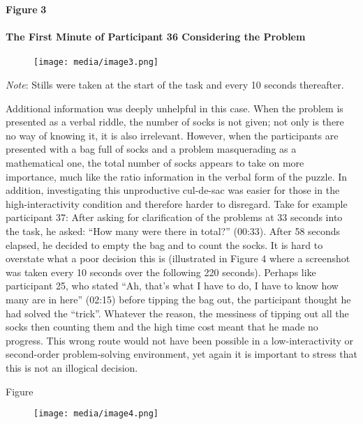 \documentclass{article}
\begin{document}
\textbf{Figure }\textbf{3 }

\paragraph{The First Minute of Participant 36 Considering the Problem }


\begin{figure}

  \texttt{[image: media/image3.png]}
\caption{}
\label{}


\end{figure}


\emph{Note}: Stills were taken at the start of the task and every 10 seconds thereafter.



Additional information was deeply unhelpful in this case. When the problem is presented as a verbal riddle, the number of socks is not given; not only is there no way of knowing it, it is also irrelevant. However, when the participants are presented with a bag full of socks and a problem masquerading as a mathematical one, the total number of socks appears to take on more importance, much like the ratio information in the verbal form of the puzzle. In addition, investigating this unproductive cul-de-sac was easier for those in the high-interactivity condition and therefore harder to disregard. Take for example participant 37: After asking for clarification of the problems at 33 seconds into the task, he asked: “How many were there in total?” (00:33). After 58 seconds elapsed, he decided to empty the bag and to count the socks. It is hard to overstate what a poor decision this is (illustrated in Figure 4 where a screenshot was taken every 10 seconds over the following 220 seconds). Perhaps like participant 25, who stated “Ah, that's what I have to do, I have to know how many are in here” (02:15) before tipping the bag out, the participant thought he had solved the “trick”. Whatever the reason, the messiness of tipping out all the socks then counting them and the high time cost meant that he made no progress. This wrong route would not have been possible in a low-interactivity or second-order problem-solving environment, yet again it is important to stress that this is not an illogical decision. 



Figure 
\begin{figure}

  \texttt{[image: media/image4.png]}
\caption{}
\label{}


\end{figure}
\end{document}
